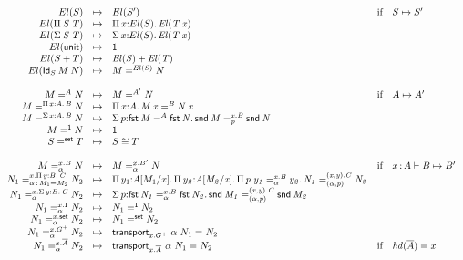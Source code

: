 \begin{small}
\[
\begin{array}{rclll}
\el{S} & \mapsto & \el{S'} & \text{if} & S \mapsto S' \\
\el{\picd{S}{T}} & \mapsto & \picl{x}{\el{S}}{\el{\app T x}} \\
\el{\sigmacd{S}{T}} & \mapsto & \sigmacl{x}{\el{S}}{\el{\app T x}} \\
\el{\unitcd} & \mapsto & \unit \\
\el{\smcd{S}{T}} & \mapsto & \sm{\el{S}}{\el{T}} \\
\el{\idcd{S}{M}{N}} & \mapsto & \iid{\el{S}}{M}{N} 
\\ \\

\iid{A}{M}{N} & \mapsto & \iid{A'}{M}{N} & \text{if} & A \mapsto A' \\
\iid{\picl{x}{A}{B}}{M}{N} & \mapsto & \picl{x}{A}{\iid{B}{\app M x}{\app N x}} & \\
\iid{\sigmacl{x}{A}{B}}{M}{N} & \mapsto & \sigmacl{p}{\iid{A}{\fst M}{\fst N}}{\iidover{x.B}{p}{\snd M}{\snd N}} & \\
\iid{\unit}{M}{N} & \mapsto & \unit \\
\iid{\set}{S}{T} & \mapsto & \equivset{S}{T} 
\\ \\

\iidover{x.B}{\alpha}{M}{N} & \mapsto & \iidover{x.B'}{\alpha}{M}{N} & \text{if} & \tptm{x}{A} \vdash B \mapsto B'\\
\iidover{x.\picl{y}{B}{C}}{\tptm{\alpha}{\iid{}{M_1}{M_2}}}{N_1}{N_2} & \mapsto & \picl{y_1}{\subst{A}{M_1}{x}}{\picl{y_2}{\subst{A}{M_2}{x}}{\picl{p}{\iidover{x.B}{\alpha}{y_1}{y_2}}{\iidover{(x,y).C}{(\alpha,p)}{N_1}{N_2}}}} \\
\iidover{x.\sigmacl{y}{B}{C}}{\alpha}{N_1}{N_2} & \mapsto & \sigmacl{p}{\iidover{x.B}{\alpha}{\fst{N_1}}{\fst{N_2}}}{\iidover{(x,y).C}{(\alpha,p)}{\snd{M_1}}{\snd{M_2}}} \\
\iidover{x.\unit}{\alpha}{N_1}{N_2} & \mapsto & \iid{\unit}{N_1}{N_2} \\
\iidover{x.\set}{\alpha}{N_1}{N_2} & \mapsto & \iid{\set}{N_1}{N_2} \\
\iidover{x.G\ep}{\alpha}{N_1}{N_2} & \mapsto & \iid{}{\transport{x.G\ep}{\alpha}{N_1}}{N_2} \\
\iidover{x.\neu{A}}{\alpha}{N_1}{N_2} & \mapsto &
\iid{}{\transport{x.\neu{A}}{\alpha}{N_1}}{N_2} & \text{if} & \hd{\neu{A}} = x\\
\end{array}
\]
\end{small}

